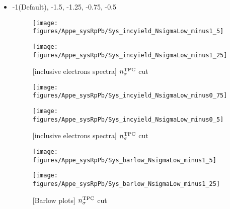  \begin{itemize}
      \item -1(Default), -1.5, -1.25, -0.75, -0.5
   
     \begin{figure}[H]
     \begin{minipage}{0.5\hsize} 
     \begin{center}
     \texttt{[image: figures/Appe\_sysRpPb/Sys\_incyield\_NsigmaLow\_minus1\_5]}
     \end{center}
     \end{minipage}
     \begin{minipage}{0.5\hsize} 
     \begin{center}
     \texttt{[image: figures/Appe\_sysRpPb/Sys\_incyield\_NsigmaLow\_minus1\_25]}
     \end{center}
     \end{minipage}
     \caption{[inclusive electrons spectra] $n_{\sigma}^{\rm{TPC}}$ cut}
     \label{fig:Sys_TPCNsigma}
     \end{figure}
      
      \begin{figure}[H]
      \begin{minipage}{0.5\hsize} 
      \begin{center}
      \texttt{[image: figures/Appe\_sysRpPb/Sys\_incyield\_NsigmaLow\_minus0\_75]}
      \end{center}
      \end{minipage}
      \begin{minipage}{0.5\hsize} 
      \begin{center}
      \texttt{[image: figures/Appe\_sysRpPb/Sys\_incyield\_NsigmaLow\_minus0\_5]}
      \end{center}
      \end{minipage}
      \caption{[inclusive electrons spectra] $n_{\sigma}^{\rm{TPC}}$ cut}
      \label{fig:Sys_TPCNsigma}
      \end{figure}
      
           \begin{figure}[H]
     \begin{minipage}{0.5\hsize} 
     \begin{center}
     \texttt{[image: figures/Appe\_sysRpPb/Sys\_barlow\_NsigmaLow\_minus1\_5]}
     \end{center}
     \end{minipage}
     \begin{minipage}{0.5\hsize} 
     \begin{center}
     \texttt{[image: figures/Appe\_sysRpPb/Sys\_barlow\_NsigmaLow\_minus1\_25]}
     \end{center}
     \end{minipage}
     \caption{[Barlow plots] $n_{\sigma}^{\rm{TPC}}$ cut}
     \label{fig:Sys_TPCNsigma}
     \end{figure}
      

\end{itemize}
